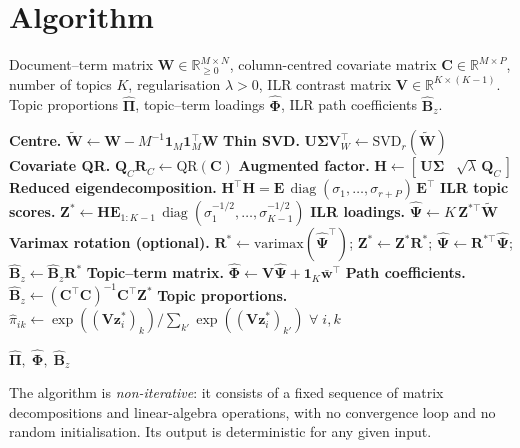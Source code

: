 \documentclass{article}
\DeclareMathOperator{\diag}{diag}
\begin{document}
\section{Algorithm}
\label{sec:algorithm}

\begin{algorithm}[t]
\caption{ILR-Spectral-GSCA Structural Topic Model}
\label{(alg:ilr_spectral_gsca)}
\begin{algorithmic}[1]
\REQUIRE Document--term matrix
  $\mathbf{W}\in\mathbb{R}^{M\times N}_{\geq 0}$,
  column-centred covariate matrix
  $\mathbf{C}\in\mathbb{R}^{M\times P}$,
  number of topics $K$,
  regularisation $\lambda>0$,
  ILR contrast matrix
  $\mathbf{V}\in\mathbb{R}^{K\times(K-1)}$.
\ENSURE Topic proportions $\hat{\boldsymbol{\Pi}}$,
  topic--term loadings $\hat{\boldsymbol{\Phi}}$,
  ILR path coefficients $\hat{\mathbf{B}}_z$.

\medskip
\STATE \textbf{Centre.}\;
  $\widetilde{\mathbf{W}} \leftarrow \mathbf{W}
    - M^{-1}\mathbf{1}_M\mathbf{1}_M^{\!\top}\mathbf{W}$
\STATE \textbf{Thin SVD.}\;
  $\mathbf{U}\boldsymbol{\Sigma}\mathbf{V}_W^{\!\top}
    \leftarrow \text{SVD}_r(\widetilde{\mathbf{W}})$
\STATE \textbf{Covariate QR.}\;
  $\mathbf{Q}_C\mathbf{R}_C \leftarrow \text{QR}(\mathbf{C})$
\STATE \textbf{Augmented factor.}\;
  $\mathbf{H} \leftarrow [\,\mathbf{U}\boldsymbol{\Sigma}
    \;\;\;\sqrt{\lambda}\,\mathbf{Q}_C\,]$
\STATE \textbf{Reduced eigendecomposition.}\;
  $\mathbf{H}^{\!\top}\mathbf{H}
    = \mathbf{E}\,\diag(\sigma_1,\dots,\sigma_{r+P})\,
      \mathbf{E}^{\!\top}$
\STATE \textbf{ILR topic scores.}\;
  $\mathbf{Z}^* \leftarrow \mathbf{H}\mathbf{E}_{1:K-1}\,
    \diag(\sigma_1^{-1/2},\dots,\sigma_{K-1}^{-1/2})$
\STATE \textbf{ILR loadings.}\;
  $\hat{\boldsymbol{\Psi}} \leftarrow
    K\,\mathbf{Z}^{*\top}\widetilde{\mathbf{W}}$
\STATE \textbf{Varimax rotation (optional).}\;
  $\mathbf{R}^* \leftarrow \text{varimax}(\hat{\boldsymbol{\Psi}}^{\!\top})$;\;
  $\mathbf{Z}^* \leftarrow \mathbf{Z}^*\mathbf{R}^*$;\;
  $\hat{\boldsymbol{\Psi}} \leftarrow \mathbf{R}^{*\top}\hat{\boldsymbol{\Psi}}$;\;
  $\hat{\mathbf{B}}_z \leftarrow \hat{\mathbf{B}}_z\mathbf{R}^*$
\STATE \textbf{Topic--term matrix.}\;
  $\hat{\boldsymbol{\Phi}} \leftarrow
    \mathbf{V}\hat{\boldsymbol{\Psi}}
    + \mathbf{1}_K\bar{\mathbf{w}}^{\!\top}$
\STATE \textbf{Path coefficients.}\;
  $\hat{\mathbf{B}}_z \leftarrow
    (\mathbf{C}^{\!\top}\mathbf{C})^{-1}
    \mathbf{C}^{\!\top}\mathbf{Z}^*$
\STATE \textbf{Topic proportions.}\;
  $\hat{\pi}_{ik} \leftarrow
    \exp((\mathbf{V}\mathbf{z}_i^*)_k)\big/
    \sum_{k'}\exp((\mathbf{V}\mathbf{z}_i^*)_{k'})$
  \quad$\forall\; i,k$

\RETURN $\hat{\boldsymbol{\Pi}},\;
  \hat{\boldsymbol{\Phi}},\;
  \hat{\mathbf{B}}_z$
\end{algorithmic}
\end{algorithm}

\noindent
The algorithm is \emph{non-iterative}: it consists of a fixed sequence
of matrix decompositions and linear-algebra operations, with no
convergence loop and no random initialisation. Its output is
deterministic for any given input.




\end{document}
